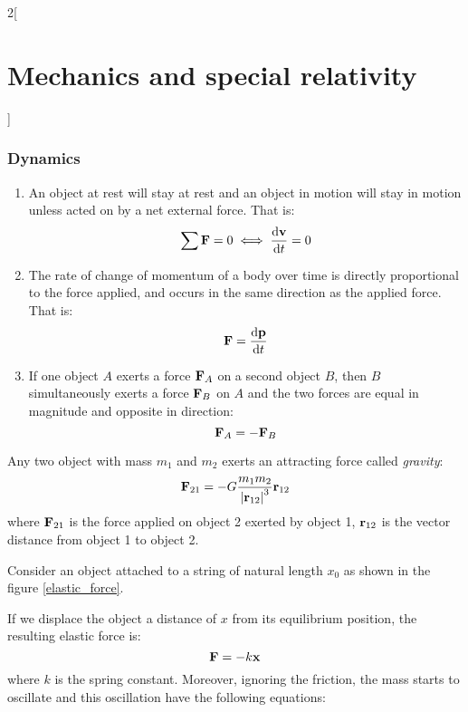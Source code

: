\documentclass[../../../main.tex]{subfiles}
\begin{document}
\begin{multicols}{2}[\section{Mechanics and special relativity}]
  \subsubsection{Dynamics}
  \begin{law}
    \hfill
    \begin{enumerate}
      \item An object at rest will stay at rest and an object in motion will stay in motion unless acted on by a net external force. That is: $$\sum\boldsymbol{\mathrm{F}}=0\iff\dv{\boldsymbol{\mathrm{v}}}{t}=0$$
      \item The rate of change of momentum of a body over time is directly proportional to the force applied, and occurs in the same direction as the applied force. That is: $$\boldsymbol{\mathrm{F}}=\dv{\boldsymbol{\mathrm{p}}}{t}$$
      \item If one object $A$ exerts a force $\boldsymbol{\mathrm{F}}_A$ on a second object $B$, then $B$ simultaneously exerts a force $\boldsymbol{\mathrm{F}}_B$ on $A$ and the two forces are equal in magnitude and opposite in direction: $$\boldsymbol{\mathrm{F}}_A=-\boldsymbol{\mathrm{F}}_B$$
    \end{enumerate}
  \end{law}
  \begin{prop}
    Any two object with mass $m_1$ and $m_2$ exerts an attracting force called \textit{gravity}:
    $$\boldsymbol{\mathrm{F}}_{21}=-G\frac{m_1m_2}{{|\boldsymbol{\mathrm{r}}_{12}|}^3}\boldsymbol{\mathrm{r}}_{12}$$
    where $\boldsymbol{\mathrm{F}}_{21}$ is the force applied on object 2 exerted by object 1, $\boldsymbol{\mathrm{r}}_{12}$ is the vector distance from object 1 to object 2.
  \end{prop}
  \begin{prop}
    Consider an object attached to a string of natural length $x_0$ as shown in the figure \ref{elastic_force}.
    \begin{center}
      \begin{minipage}{\linewidth}
        \centering
        
        \label{elastic_force}
      \end{minipage}
    \end{center}
    If we displace the object a distance of $x$ from its equilibrium position, the resulting elastic force is: $$\boldsymbol{\mathrm{F}}=-k\boldsymbol{\mathrm{x}}$$ where $k$ is the spring constant. Moreover, ignoring the friction, the mass starts to oscillate and this oscillation have the following equations:

\end{prop}
\end{multicols}
\end{document}
